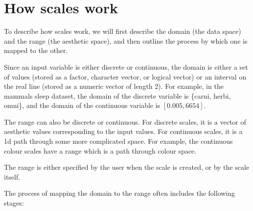 \section{How scales work}
\label{sec:how-scales-work}

To describe how scales work, we will first describe the domain (the data space) and the range (the aesthetic space), and then outline the process by which one is mapped to the other.

Since an input variable is either discrete or continuous, the domain is either a set of values (stored as a factor, character vector, or logical vector) or an interval on the real line (stored as a numeric vector of length 2). For example, in the mammals sleep dataset, the domain of the discrete variable  is \{carni, herbi, omni\}, and the domain of the continuous variable  is $[0.005, 6654]$.

The range can also be discrete or continuous.  For discrete scales, it is a vector of aesthetic values corresponding to the input values. For continuous scales, it is a 1d path through some more complicated space.  For example, the continuous colour scales have a range which is a path through colour space.


The range is either specified by the user when the scale is created, or by the scale itself.

The process of mapping the domain to the range often includes the following stages:

